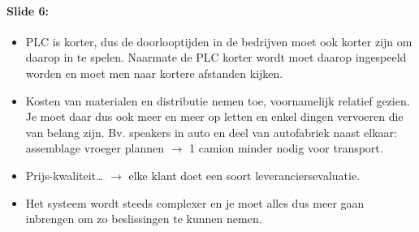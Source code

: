 \documentclass[10pt,a4paper]{report}
\begin{document}
\paragraph{Slide 6:}
\begin{itemize} 
\item PLC is korter, dus de doorlooptijden in de bedrijven moet ook korter zijn om daarop in te spelen. Naarmate de PLC korter wordt moet daarop ingespeeld worden en moet men naar kortere afstanden kijken.
\item Kosten van materialen en distributie nemen toe, voornamelijk relatief gezien. Je moet daar dus ook meer en meer op letten en enkel dingen vervoeren die van belang zijn. Bv. speakers in auto en deel van autofabriek naast elkaar: assemblage vroeger plannen $\rightarrow$ 1 camion minder nodig voor transport.
\item Prijs-kwaliteit… $\rightarrow$ elke klant doet een soort leveranciersevaluatie.
\item Het systeem wordt steeds complexer en je moet alles dus meer gaan inbrengen om zo beslissingen te kunnen nemen. 
\end{itemize}
\end{document}
